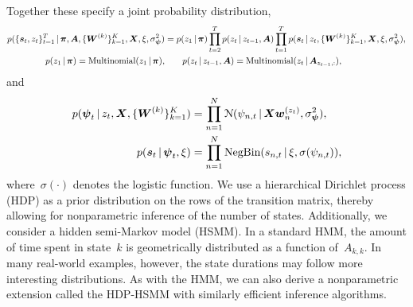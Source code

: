 \documentclass[aos,noinfoline]{imsart} %
\begin{document}
Together these specify a joint probability distribution,
\begin{align*}
p(\{\bs_t, z_t\}_{t=1}^T \given \bpi, \bA, \{\bW^{(k)}\}_{k=1}^K, \bX, \xi, \sigma_{\bpsi}^2) &= p(z_1\given \bpi) \prod_{t=2}^T p(z_t \given z_{t-1}, \bA) \prod_{t=1}^T p(\bs_t \given z_t, \{\bW^{(k)}\}_{k=1}^K, \bX, \xi, \sigma_{\bpsi}^2),\\
p(z_1 \given \bpi) = \text{Multinomial}(z_1 \given \bpi), &\qquad p(z_t \given z_{t-1}, \bA) = \text{Multinomial}(z_t \given \bA_{z_{t-1},:}),
\end{align*}
and
\begin{align*}
p(\bpsi_t \given z_t, \bX, \{\bW^{(k)}\}_{k=1}^K) &= \prod_{n=1}^N \distNormal(\psi_{n,t} \given \bX\bw_{n}^{(z_t)}, \sigma_{\bpsi}^2), \\
p(\bs_t \given \bpsi_t, \xi) &= \prod_{n=1}^N \text{NegBin}(s_{n,t} \given \xi, \sigma(\psi_{n,t})),
\end{align*}
where~$\sigma(\cdot)$ denotes the logistic function. 
We use a hierarchical Dirichlet process (HDP) as a prior distribution on the rows of the transition matrix, thereby allowing for nonparametric inference of the number of states.  Additionally, we consider a hidden semi-Markov model (HSMM). In a standard HMM, the amount of time spent in state~$k$ is geometrically distributed as a function of~$A_{k,k}$. In many real-world examples, however, the state durations may follow more interesting distributions. As with the HMM, we can also derive a nonparametric extension called the HDP-HSMM with similarly efficient inference algorithms. 
\end{document}

